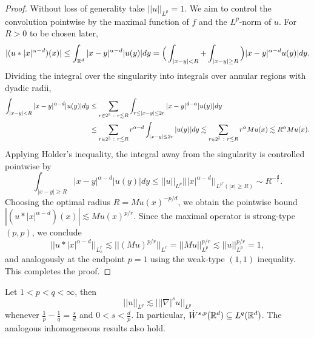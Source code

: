 \begin{proof}
	Without loss of generality take $||u||_{L^p} = 1$. We aim to control the convolution pointwise by the maximal function of $f$ and the $L^p$-norm of $u$. For $R > 0$ to be chosen later, 	
		\[ |(u * |x|^{\alpha - d})(x)| \leq \int_{\mathbb R^d} |x - y|^{\alpha - d} |u(y)| dy = \Big( \int_{|x - y| < R} + \int_{|x - y| \geq R} \Big)  |x - y|^{\alpha - d} u(y)| dy. \]
	Dividing the integral over the singularity into integrals over annular regions with dyadic radii, 
		\begin{align*}
			\int_{|x - y| < R}  |x - y|^{\alpha - d} |u(y)| dy 
				&\leq \sum_{r \in 2^\mathbb Z \ : \ r \lesssim R} \int_{r \leq |x - y| \leq 2r}  |x - y|^{d - \alpha} |u(y)| dy \\
				&\leq \sum_{r \in 2^\mathbb Z \ : \ r \lesssim R} r^{\alpha - d} \int_{|x - y| \leq 2r} |u(y)| dy \lesssim  \sum_{r \in 2^\mathbb Z \ : \ r \lesssim R} r^{\alpha} Mu (x) \lesssim R^{\alpha} Mu(x).
		\end{align*}	
	Applying Holder's inequality, the integral away from the singularity is controlled pointwise by
		\[  \int_{|x - y| \geq R}  |x - y|^{\alpha - d} |u(y)| dy \leq ||u||_{L^p} || |x|^{\alpha - d} ||_{L^{p'} (|x| \geq R)} \sim R^{-\frac{d}{r}}. \]
	 Choosing the optimal radius $R = Mu(x)^{-p/d}$, we obtain the pointwise bound $|(u * |x|^{\alpha - d} ) (x)| \lesssim Mu (x)^{p/r}$. Since the maximal operator is strong-type $(p, p)$, we conclude
		\[ ||u * |x|^{\alpha - d} ||_{L^r_x} \lesssim ||(Mu)^{p/r}||_{L^r} = ||Mu||^{p/r}_{L^p} \lesssim ||u||_{L^p}^{p /r} =1,  \]
	and analogously at the endpoint $p = 1$ using the weak-type $(1, 1)$ inequality. This completes the proof. 
\end{proof}

\begin{theorem}
	Let $1  < p < q < \infty$, then 
		\[ ||u||_{L^q} \lesssim |||\nabla|^s u||_{L^p} \]
	whenever $\tfrac1p - \tfrac1q = \tfrac{s}{d}$ and $0 < s < \tfrac{d}{p}$. In particular, $\dot W^{s, p} (\mathbb R^d) \subseteq L^q (\mathbb R^d)$. The analogous inhomogeneous results also hold.
\end{theorem}

